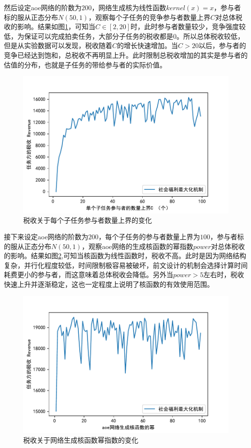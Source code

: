 \documentclass[promaster]{thesis-uestc}
\begin{document}
然后设定aoe网络的阶数为$200$，网络生成核为线性函数$kernel(x)=x$，参与者标的服从正态分布$N(50,1)$，观察每个子任务的竞争参与者数量上界$C$对总体税收的影响。结果如图\ref{revenuevsc}，可知当$C \in [2,20]$时，此时参与者数量较少，竞争强度较低，为保证可以完成拍卖任务，大部分子任务的税收都是0。所以总体税收较低，但是从实验数据可以发现，税收随着$C$的增长快速增加。当$C > 20$以后，参与者的竞争已经达到饱和，总税收不再明显上升。此时限制总税收增加的其实是参与者的估值的分布，也就是子任务的带给参与者的实际价值。

\begin{figure}[H]
    \includegraphics[width=325pt]{exp/revenuevsc.pdf}
    \caption{税收关于每个子任务参与者数量上界的变化}
    \label{revenuevsc}
\end{figure}

接下来设定aoe网络的阶数为$200$，每个子任务的参与者数量上界为$100$，参与者标的服从正态分布$N(50,1)$，观察aoe网络的生成核函数的幂指数$power$对总体税收的影响。结果如图\ref{revenuevspower},可知当核函数为线性函数时，税收不高。此时是因为网络结构复杂，并行化程度较低，时间限制极容易被破坏，前文设计的机制会选择计算时间耗费更小的参与者，而这意味着总体税收会降低。另外当$power>5$左右时，税收快速上升并逐渐稳定，这也一定程度上说明了核函数的有效使用范围。

\begin{figure}[H]
    \includegraphics[width=325pt]{exp/revenuevspower.pdf}
    \caption{税收关于网络生成核函数幂指数的变化}
    \label{revenuevspower}
\end{figure}
\end{document}
